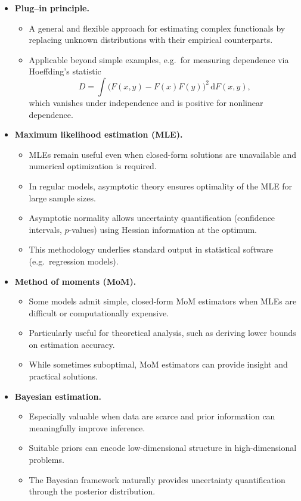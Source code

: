 \begin{itemize}
    \item \textbf{Plug--in principle.}
    \begin{itemize}
        \item A general and flexible approach for estimating complex functionals by replacing unknown distributions with their empirical counterparts.
        \item Applicable beyond simple examples, e.g.\ for measuring dependence via Hoeffding’s statistic
        \[
        D = \int \bigl(F(x,y)-F(x)F(y)\bigr)^2 \,\mathrm{d}F(x,y),
        \]
        which vanishes under independence and is positive for nonlinear dependence.
    \end{itemize}

    \item \textbf{Maximum likelihood estimation (MLE).}
    \begin{itemize}
        \item MLEs remain useful even when closed-form solutions are unavailable and numerical optimization is required.
        \item In regular models, asymptotic theory ensures optimality of the MLE for large sample sizes.
        \item Asymptotic normality allows uncertainty quantification (confidence intervals, $p$-values) using Hessian information at the optimum.
        \item This methodology underlies standard output in statistical software (e.g.\ regression models).
    \end{itemize}

    \item \textbf{Method of moments (MoM).}
    \begin{itemize}
        \item Some models admit simple, closed-form MoM estimators when MLEs are difficult or computationally expensive.
        \item Particularly useful for theoretical analysis, such as deriving lower bounds on estimation accuracy.
        \item While sometimes suboptimal, MoM estimators can provide insight and practical solutions.
    \end{itemize}

    \item \textbf{Bayesian estimation.}
    \begin{itemize}
        \item Especially valuable when data are scarce and prior information can meaningfully improve inference.
        \item Suitable priors can encode low-dimensional structure in high-dimensional problems.
        \item The Bayesian framework naturally provides uncertainty quantification through the posterior distribution.
    \end{itemize}
\end{itemize}
